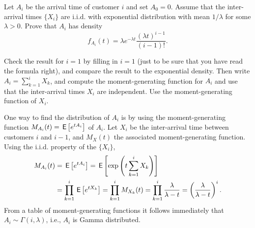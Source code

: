 \begin{exercise}
 Let $A_i$ be the arrival time of customer $i$ and set $A_0=0$.
 Assume that the inter-arrival times $\{X_i\}$ are i.i.d.
 with exponential distribution with mean $1/\lambda$ for some $\lambda>0$.
 Prove that $A_i$ has density
\begin{equation*}
f_{A_i}(t) = \lambda e^{-\lambda t} \frac{(\lambda t)^{i-1}}{(i-1)!}.
\end{equation*}
\begin{hint}
 Check the result for $i=1$ by filling in $i=1$ (just to be
 sure that you have read the formula right), and compare the result
 to the exponential density. Then write $A_i =\sum_{k=1}^i X_k$, and compute the moment-generating function for $A_i$ and use that the inter-arrival times
 $X_i$ are independent. Use the moment-generating function of $X_i$.
\end{hint}
\begin{solution}
 One way to find the distribution of $A_i$ is by using the moment-generating function $M_{A_i}(t) = \,\mathsf{E}\left[e^{t A_i}\right]$ of $A_i$.
 Let $X_i$ be the inter-arrival time between customers $i$ and $i-1$, and $M_X(t)$ the associated moment-generating function.
 Using the i.i.d.
 property of the $\{X_i\}$,
\begin{align*}
 M_{A_i}(t) &= \,\mathsf{E}\left[e^{t A_i}\right] = \,\mathsf{E}\left[\exp\left(t\sum_{k=1}^{i} X_k\right)\right] \\
& = \prod_{k=1}^{i} \,\mathsf{E}\left[e^{tX_k}\right] = 
\prod_{k=1}^{i} M_{X_k}(t) = 
\prod_{k=1}^{i} \frac{\lambda}{\lambda -t }
 = \left(\frac{\lambda}{\lambda -t }\right)^i.
\end{align*}
From a table of moment-generating functions it follows immediately that
$A_i \sim \Gamma(i,\lambda)$, i.e., $A_i$ is Gamma distributed.
\end{solution}
\end{exercise}

